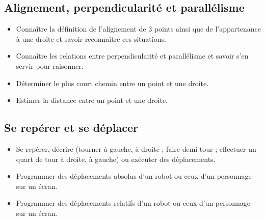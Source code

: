 \documentclass[a4paper,12pt,fleqn]{article}		
\begin{document}
\subsection*{Alignement, perpendicularité et parallélisme}

\begin{itemize}
	\item {}Connaître la définition de l’alignement de 3 points ainsi que de l’appartenance à une droite et savoir reconnaître ces situations.
	\item {}Connaître les relations entre perpendicularité et parallélisme et savoir s’en servir pour raisonner.
	\item {}Déterminer le plus court chemin entre un point et une droite.
	\item {}Estimer la distance entre un point et une droite.
\end{itemize}

\subsection*{Se repérer et se déplacer}

\begin{itemize}
	\item {}Se repérer, décrire (tourner à gauche, à droite ; faire demi-tour ; effectuer un quart de tour à droite, à gauche) ou exécuter des déplacements.
	\item {}Programmer des déplacements absolus d’un robot ou ceux d’un personnage sur un écran. %
	\item {}Programmer des déplacements relatifs d’un robot ou ceux d’un personnage sur un écran. %
\end{itemize}
\end{document}
